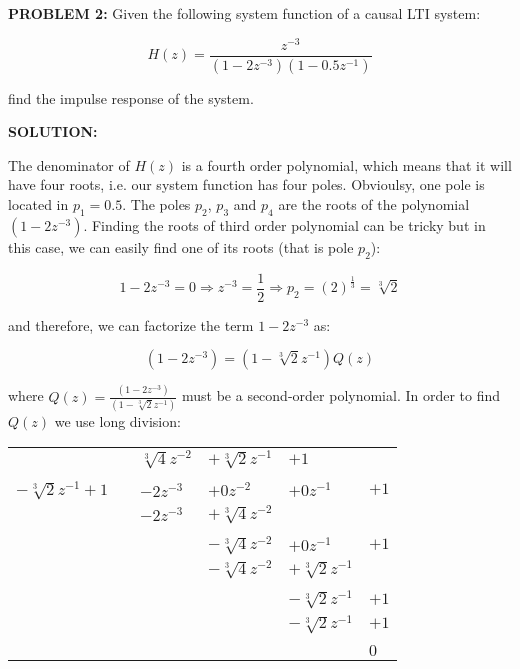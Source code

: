 \documentclass[a4paper,11pt,oneside]{article}
\begin{document}
\vspace{1cm}

\noindent \textbf{PROBLEM 2:} Given the following system function of a causal LTI system:

\begin{equation}\label{eq:systemfunction}
H(z)=\frac{z^{-3}}{(1-2z^{-3})(1-0.5z^{-1})}
\end{equation}

find the impulse response of the system.
\vspace{1cm}


\textbf{SOLUTION:}


The denominator of $H(z)$ is a fourth order polynomial, which means that it will have four roots, i.e. our system function has four poles. Obvioulsy, one pole is located in $p_1=0.5$. The poles $p_2$, $p_3$ and $p_4$ are the roots of the polynomial $(1-2z^{-3})$. Finding the roots of third order polynomial can be tricky but in this case, we can easily find one of its roots (that is pole $p_2$):

\[
1-2z^{-3} = 0 \Rightarrow z^{-3}=\frac{1}{2}  \Rightarrow p_{2}=(2)^{\frac{1}{3}}=\sqrt[3]{2}
\]

and therefore, we can factorize the term $1-2z^{-3}$ as:

\[
(1-2z^{-3})=(1-\sqrt[3]{2}z^{-1})Q(z)
\]

where $Q(z)=\frac{(1-2z^{-3})}{(1-\sqrt[3]{2}z^{-1})}$ must be a second-order polynomial. In order to find $Q(z)$ we use long division:

\begin{tabular}{r|cllll}
&\qquad& $\sqrt[3]{4}z^{-2}$ & $+\sqrt[3]{2}z^{-1}$ & $+1$&\\
\cline{2-6}
\\
$-\sqrt[3]{2}z^{-1}+1$ && $-2z^{-3}$ & $+0z^{-2}$&$+0z^{-1}$&$+1$\\
&& $-2z^{-3}$ & $+\sqrt[3]{4}z^{-2}$&&\\
\cline{3-6}\\
&&&$-\sqrt[3]{4}z^{-2}$&$+0z^{-1}$&$+1$\\
&&&$-\sqrt[3]{4}z^{-2}$&$+\sqrt[3]{2}z^{-1}$&\\
\cline{4-6}\\
&&&&$-\sqrt[3]{2}z^{-1}$&$+1$\\
&&&&$-\sqrt[3]{2}z^{-1}$&$+1$\\
\cline{5-6}\\
&&&&&$0$\\
\end{tabular}
\end{document}
